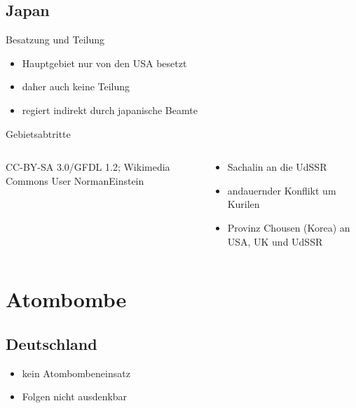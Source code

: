 \subsection{Japan}

\begin{frame}{Besatzung und Teilung}
	\begin{itemize}
		\item Hauptgebiet nur von den USA besetzt
		\pause
		\item daher auch keine Teilung
		\pause
		\item regiert indirekt durch japanische Beamte
	\end{itemize}
\end{frame}

\begin{frame}{Gebietsabtritte}
	\begin{columns}
		\begin{column}{0.6\textwidth}
			{CC-BY-SA 3.0/GFDL 1.2; Wikimedia Commons User NormanEinstein}
		\end{column}
		\begin{column}{0.39\textwidth}
			\begin{itemize}
				\item Sachalin an die UdSSR
				\pause
				\item andauernder Konflikt um Kurilen
				\pause
				\item Provinz Chousen (Korea) an USA, UK und UdSSR
			\end{itemize}
		\end{column}
	\end{columns}
\end{frame}

\section{Atombombe}

\subsection{Deutschland}
\begin{frame}
	\begin{itemize}
		\item kein Atombombeneinsatz
		\pause
		\item Folgen nicht ausdenkbar
	\end{itemize}
\end{frame}

